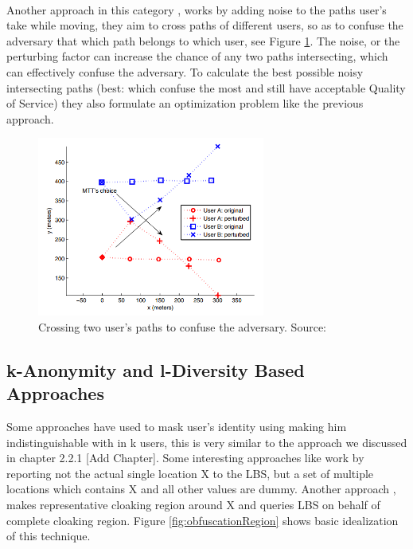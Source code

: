 \documentclass[12pt]{report}
\theoremstyle{named}
\begin{document}
\paragraph{}
Another approach in this category \cite{hoh2005protecting}, works by adding noise to the paths user's take while moving, they aim to cross paths of different users, so as to confuse the adversary that which path belongs to which user, see Figure \ref{fig:pathConfusion}. The noise, or the perturbing factor can increase the chance of any two paths intersecting, which can effectively confuse the adversary. To calculate the best possible noisy intersecting paths (best: which confuse the most and still have acceptable Quality of Service) they also formulate an optimization problem like the previous approach. 
\begin{figure}[ht]
\centering
        \includegraphics[width=75mm,scale=0.5]{Images/PathConfusion.PNG}
    \caption{Crossing two user's paths to confuse the adversary. Source:\cite{hoh2005protecting}}
    \label{fig:pathConfusion}
\end{figure}

\subsection{k-Anonymity and l-Diversity Based Approaches}
Some approaches have used to mask user's identity using making him indistinguishable with in k users, this is very similar to the approach we discussed in chapter 2.2.1 [Add Chapter]. Some interesting approaches like \cite{kido2005protection} work by reporting not the actual single location X to the LBS, but a set of multiple locations which contains X and all other values are dummy. Another approach \cite{duckham2005formal}, makes representative cloaking region around X and queries LBS on behalf of complete cloaking region. Figure \ref{fig:obfuscationRegion} shows basic idealization of this technique.
\end{document}
